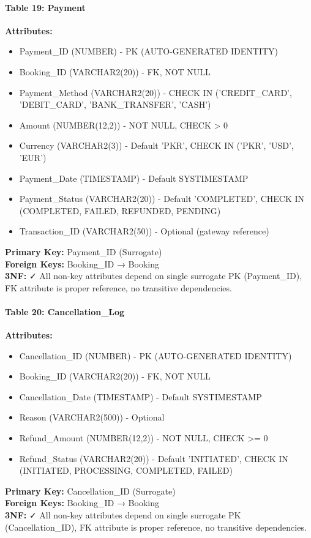 \documentclass[12pt,a4paper,openany]{report}
\begin{document}
\paragraph{Table 19: Payment}
\textbf{Attributes:} 
\begin{itemize}
    \item Payment\_ID (NUMBER) - PK (AUTO-GENERATED IDENTITY)
    \item Booking\_ID (VARCHAR2(20)) - FK, NOT NULL
    \item Payment\_Method (VARCHAR2(20)) - CHECK IN ('CREDIT\_CARD', 'DEBIT\_CARD', 'BANK\_TRANSFER', 'CASH')
    \item Amount (NUMBER(12,2)) - NOT NULL, CHECK > 0
    \item Currency (VARCHAR2(3)) - Default 'PKR', CHECK IN ('PKR', 'USD', 'EUR')
    \item Payment\_Date (TIMESTAMP) - Default SYSTIMESTAMP
    \item Payment\_Status (VARCHAR2(20)) - Default 'COMPLETED', CHECK IN (COMPLETED, FAILED, REFUNDED, PENDING)
    \item Transaction\_ID (VARCHAR2(50)) - Optional (gateway reference)
\end{itemize}
\textbf{Primary Key:} Payment\_ID (Surrogate)\\
\textbf{Foreign Keys:} Booking\_ID → Booking\\
\textbf{3NF:} ✓ All non-key attributes depend on single surrogate PK (Payment\_ID), FK attribute is proper reference, no transitive dependencies.

\paragraph{Table 20: Cancellation\_Log}
\textbf{Attributes:} 
\begin{itemize}
    \item Cancellation\_ID (NUMBER) - PK (AUTO-GENERATED IDENTITY)
    \item Booking\_ID (VARCHAR2(20)) - FK, NOT NULL
    \item Cancellation\_Date (TIMESTAMP) - Default SYSTIMESTAMP
    \item Reason (VARCHAR2(500)) - Optional
    \item Refund\_Amount (NUMBER(12,2)) - NOT NULL, CHECK >= 0
    \item Refund\_Status (VARCHAR2(20)) - Default 'INITIATED', CHECK IN (INITIATED, PROCESSING, COMPLETED, FAILED)
\end{itemize}
\textbf{Primary Key:} Cancellation\_ID (Surrogate)\\
\textbf{Foreign Keys:} Booking\_ID → Booking\\
\textbf{3NF:} ✓ All non-key attributes depend on single surrogate PK (Cancellation\_ID), FK attribute is proper reference, no transitive dependencies.
\end{document}
